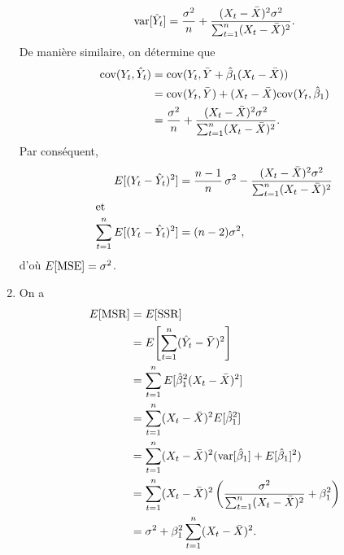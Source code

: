 \begin{solution}{2.8}
\begin{enumerate}
      \begin{displaymath}
        \mathrm{var} [ \hat{Y}_t ] = \frac{\sigma^2}{n} +
        \frac{(X_t - \bar{X})^2 \sigma^2}{\sum_{t=1}^n (X_t - \bar{X})^2}.
      \end{displaymath}
      De manière similaire, on détermine que
      \begin{align*}
        \mathrm{cov}(Y_t, \hat{Y}_t)
        &= \mathrm{cov}(Y_t, \bar{Y} + \hat{\beta}_1 (X_t - \bar{X})) \\
        &= \mathrm{cov}(Y_t, \bar{Y}) +
        (X_t - \bar{X}) \mathrm{cov}(Y_t, \hat{\beta}_1) \\
        &= \frac{\sigma^2}{n} + \frac{(X_t -
          \bar{X})^2 \sigma^2}{\sum_{t=1}^n (X_t - \bar{X})^2}.
      \end{align*}
      Par conséquent,
      \begin{align*}
        E [ (Y_t - \hat{Y}_t)^2 ]
        &= \frac{n - 1}{n}\, \sigma^2 -
        \frac{(X_t - \bar{X})^2 \sigma^2}{\sum_{t = 1}^n (X_t - \bar{X})^2} \\
        \intertext{et}
        \sum_{t=1}^n E [ (Y_t - \hat{Y}_t)^2 ]
        & = (n - 2) \sigma^2,
      \end{align*}
      d'où $E [ \mathrm{MSE} ] = \sigma^2$.
    \item On a
      \begin{align*}
        E [ \mathrm{MSR} ]
        &= E [ \mathrm{SSR} ] \\
        &= E\! \left[ \sum_{t=1}^n (\hat{Y}_t - \bar{Y})^2 \right] \\
        &= \sum_{t=1}^n E [ \hat{\beta}_1^2 (X_t - \bar{X})^2 ] \\
        &= \sum_{t=1}^n (X_t - \bar{X})^2 E [ \hat{\beta}_1^2 ] \\
        &= \sum_{t=1}^n (X_t - \bar{X})^2 (\mathrm{var} [ \hat{\beta}_1 ] +
        E [ \hat{\beta}_1 ]^2) \\
        &= \sum_{t=1}^n (X_t - \bar{X})^2
        \left(
          \frac{\sigma^2}{\sum_{t=1}^n (X_t - \bar{X})^2} + \beta_1^2
        \right) \\
        &= \sigma^2 + \beta_1^2 \sum_{t=1}^n (X_t - \bar{X})^2.
      \end{align*}
    \end{enumerate}
  
\end{solution}
